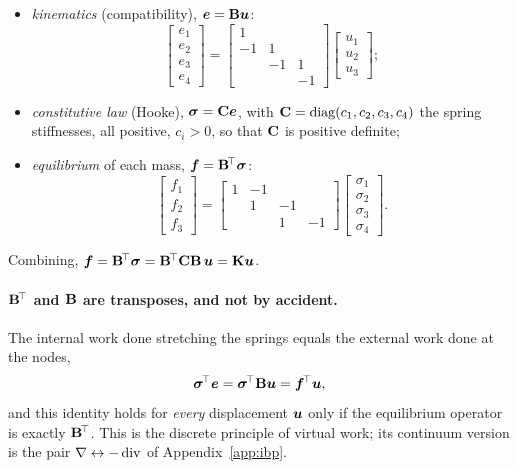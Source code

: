 \begin{itemize}
\item \emph{kinematics} (compatibility), $\bm{e}=\mathbf{B}\bm{u}$:
\[
  \begin{bmatrix} e_1\\ e_2\\ e_3\\ e_4 \end{bmatrix}
  =\begin{bmatrix} 1 & & \\ -1 & 1 & \\ & -1 & 1 \\ & & -1 \end{bmatrix}
  \begin{bmatrix} u_1 \\ u_2 \\ u_3 \end{bmatrix};
\]
\item \emph{constitutive law} (Hooke), $\bm{\sigma}=\mathbf{C}\bm{e}$, with
$\mathbf{C}=\operatorname{diag}(c_1,c_2,c_3,c_4)$ the spring stiffnesses, all positive,
$c_i>0$, so that $\mathbf{C}$ is positive definite;
\item \emph{equilibrium} of each mass, $\bm{f}=\mathbf{B}^{\!\top}\bm{\sigma}$:
\[
  \begin{bmatrix} f_1 \\ f_2 \\ f_3 \end{bmatrix}
  =\begin{bmatrix} 1 & -1 & & \\ & 1 & -1 & \\ & & 1 & -1 \end{bmatrix}
  \begin{bmatrix} \sigma_1\\ \sigma_2\\ \sigma_3\\ \sigma_4 \end{bmatrix}.
\]
\end{itemize}
Combining, $\bm{f}=\mathbf{B}^{\!\top}\bm{\sigma}=\mathbf{B}^{\!\top}\mathbf{C}\mathbf{B}\,\bm{u}=\mathbf{K}\bm{u}$.

\paragraph{$\mathbf{B}^{\!\top}$ and $\mathbf{B}$ are transposes, and not by accident.} The
%
internal work done stretching the springs equals the external work done at
the nodes,
\[
  \bm{\sigma}^{\!\top}\bm{e}=\bm{\sigma}^{\!\top}\mathbf{B}\bm{u}=\bm{f}^{\!\top}\bm{u} ,
\]
and this identity holds for \emph{every} displacement $\bm{u}$ only if the
equilibrium operator is exactly $\mathbf{B}^{\!\top}$. This is the discrete principle of
virtual work; its continuum version is the pair
$\nabla\leftrightarrow-\operatorname{div}$ of Appendix~\ref{app:ibp}.

